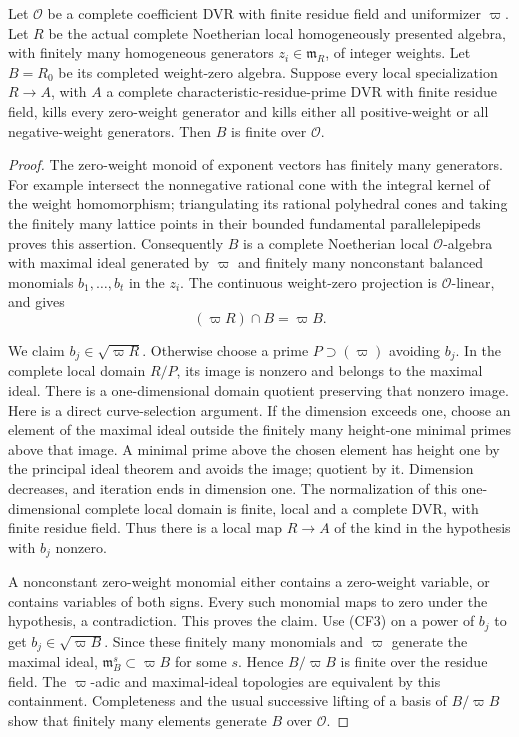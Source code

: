 \begin{srlemma}\label{lem:sr-graded-finite-part-criterion}
Let \(\mathcal O\) be a complete coefficient DVR with
finite residue field and uniformizer \(\varpi\).
Let \(R\) be the actual complete Noetherian local
homogeneously presented algebra, with finitely many
homogeneous generators \(z_i\in\mathfrak m_R\),
of integer weights.
Let \(B=R_0\) be its completed weight-zero algebra.
Suppose every local specialization \(R\to A\), with
\(A\) a complete characteristic-residue-prime DVR
with finite residue field, kills every zero-weight
generator and kills either all positive-weight or
all negative-weight generators.
Then \(B\) is finite over \(\mathcal O\).
\end{srlemma}
\begin{proof}
The zero-weight monoid of exponent vectors has finitely
many generators.
For example intersect the nonnegative rational cone
with the integral kernel of the weight homomorphism;
triangulating its rational polyhedral cones and taking
the finitely many lattice points in their bounded
fundamental parallelepipeds proves this assertion.
Consequently \(B\) is a complete Noetherian local
\(\mathcal O\)-algebra with maximal ideal generated by
\(\varpi\) and finitely many nonconstant balanced
monomials \(b_1,\ldots,b_t\) in the \(z_i\).
The continuous weight-zero projection is
\(\mathcal O\)-linear, and gives
\[
                       (\varpi R)\cap B=\varpi B.
 \tag{CF3}
\]

We claim \(b_j\in\sqrt{\varpi R}\).
Otherwise choose a prime \(P\supset(\varpi)\) avoiding
\(b_j\).
In the complete local domain \(R/P\), its image is
nonzero and belongs to the maximal ideal.
There is a one-dimensional domain quotient preserving
that nonzero image.
Here is a direct curve-selection argument.
If the dimension exceeds one, choose an element of
the maximal ideal outside the finitely many height-one
minimal primes above that image.
A minimal prime above the chosen element has height
one by the principal ideal theorem and avoids the
image; quotient by it.
Dimension decreases, and iteration ends in dimension one.
The normalization of this one-dimensional complete local
domain is finite, local and a complete DVR, with finite
residue field.
Thus there is a local map \(R\to A\) of the kind in
the hypothesis with \(b_j\) nonzero.

A nonconstant zero-weight monomial either contains a
zero-weight variable, or contains variables of both
signs.
Every such monomial maps to zero under the hypothesis,
a contradiction.
This proves the claim.
Use (CF3) on a power of \(b_j\) to get
\(b_j\in\sqrt{\varpi B}\).
Since these finitely many monomials and \(\varpi\)
generate the maximal ideal,
\(\mathfrak m_B^s\subset\varpi B\) for some \(s\).
Hence \(B/\varpi B\) is finite over the residue field.
The \(\varpi\)-adic and maximal-ideal topologies are
equivalent by this containment.
Completeness and the usual successive lifting of a
basis of \(B/\varpi B\) show that finitely many elements
generate \(B\) over \(\mathcal O\).
\end{proof}

